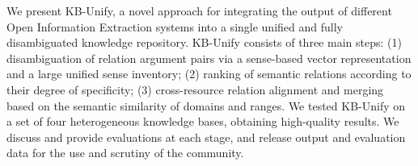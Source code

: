 We present KB-Unify, a novel approach for integrating the output of different Open Information Extraction systems into a single unified and fully disambiguated knowledge repository. KB-Unify consists of three main steps: (1) disambiguation of relation argument pairs via a sense-based vector representation and a large unified sense inventory; (2) ranking of semantic relations according to their degree of specificity; (3) cross-resource relation alignment and merging based on the semantic similarity of domains and ranges. We tested KB-Unify on a set of four heterogeneous knowledge bases, obtaining high-quality results. We discuss and provide evaluations at each stage, and release output and evaluation data for the use and scrutiny of the community.
